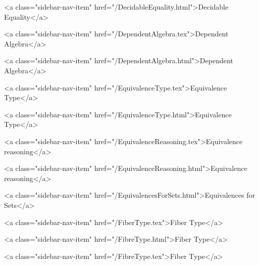       
    
      
        
          <a class="sidebar-nav-item" href="/DecidableEquality.html">Decidable Equality</a>
        
      
    
      
        
          <a class="sidebar-nav-item" href="/DependentAlgebra.tex">Dependent Algebra</a>
        
      
    
      
        
          <a class="sidebar-nav-item" href="/DependentAlgebra.html">Dependent Algebra</a>
        
      
    
      
        
          <a class="sidebar-nav-item" href="/EquivalenceType.tex">Equivalence Type</a>
        
      
    
      
        
          <a class="sidebar-nav-item" href="/EquivalenceType.html">Equivalence Type</a>
        
      
    
      
        
          <a class="sidebar-nav-item" href="/EquivalenceReasoning.tex">Equivalence reasoning</a>
        
      
    
      
        
          <a class="sidebar-nav-item" href="/EquivalenceReasoning.html">Equivalence reasoning</a>
        
      
    
      
        
          <a class="sidebar-nav-item" href="/EquivalencesForSets.html">Equivalences for Sets</a>
        
      
    
      
        
          <a class="sidebar-nav-item" href="/FiberType.tex">Fiber Type</a>
        
      
    
      
        
          <a class="sidebar-nav-item" href="/FibreType.html">Fiber Type</a>
        
      
    
      
        
          <a class="sidebar-nav-item" href="/FibreType.tex">Fiber Type</a>
        
